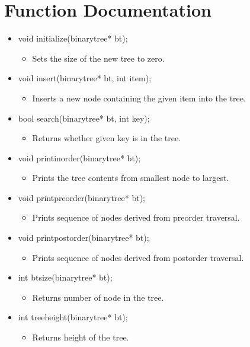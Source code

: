 \documentclass{article}
\begin{document}
\section{Function Documentation}
\begin{itemize}
	\item void initialize(binary\textunderscore tree* bt);
		\begin{itemize}
			\item Sets the size of the new tree to zero.
		\end{itemize}
	\item void insert(binary\textunderscore tree* bt, int item);
		\begin{itemize}
			\item Inserts a new node containing the given item into the tree.
		\end{itemize}
	\item bool search(binary\textunderscore tree* bt, int key);
		\begin{itemize}
			\item Returns whether given key is in the tree.
		\end{itemize}
	\item void printinorder(binary\textunderscore tree* bt);
		\begin{itemize}
			\item Prints the tree contents from smallest node to largest.
		\end{itemize}
	\item void printpreorder(binary\textunderscore tree* bt);
		\begin{itemize}
			\item Prints sequence of nodes derived from preorder traversal.
		\end{itemize}
	\item void printpostorder(binary\textunderscore tree* bt);
		\begin{itemize}
			\item Prints sequence of nodes derived from postorder traversal.
		\end{itemize}
	\item int btsize(binary\textunderscore tree* bt);
		\begin{itemize}
			\item Returns number of node in the tree.
		\end{itemize}
	\item int treeheight(binary\textunderscore tree* bt);
		\begin{itemize}
			\item Returns height of the tree.
		\end{itemize}
\end{itemize}
\end{document}
